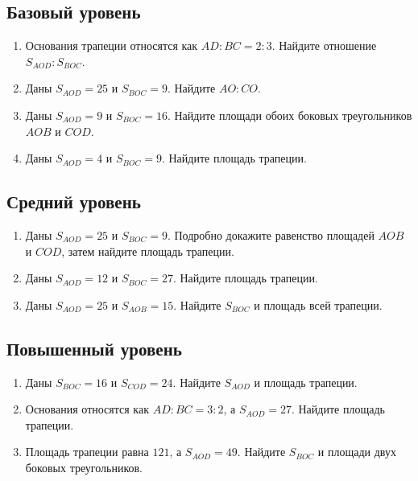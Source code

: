 \documentclass[a4paper,12pt]{article}
\begin{document}
\subsection{Базовый уровень}
\begin{enumerate}[label=\textbf{\arabic*.},itemsep=9pt]
\item Основания трапеции относятся как $AD:BC=2:3$. Найдите отношение $S_{AOD}:S_{BOC}$.
\item Даны $S_{AOD}=25$ и $S_{BOC}=9$. Найдите $AO:CO$.
\item Даны $S_{AOD}=9$ и $S_{BOC}=16$. Найдите площади обоих боковых треугольников $AOB$ и $COD$.
\item Даны $S_{AOD}=4$ и $S_{BOC}=9$. Найдите площадь трапеции.
\end{enumerate}

\subsection{Средний уровень}
\begin{enumerate}[label=\textbf{\arabic*.},start=5,itemsep=9pt]
\item Даны $S_{AOD}=25$ и $S_{BOC}=9$. Подробно докажите равенство площадей $AOB$ и $COD$, затем найдите площадь трапеции.
\item Даны $S_{AOD}=12$ и $S_{BOC}=27$. Найдите площадь трапеции.
\item Даны $S_{AOD}=25$ и $S_{AOB}=15$. Найдите $S_{BOC}$ и площадь всей трапеции.
\end{enumerate}

\subsection{Повышенный уровень}
\begin{enumerate}[label=\textbf{\arabic*.},start=8,itemsep=9pt]
\item Даны $S_{BOC}=16$ и $S_{COD}=24$. Найдите $S_{AOD}$ и площадь трапеции.
\item Основания относятся как $AD:BC=3:2$, а $S_{AOD}=27$. Найдите площадь трапеции.
\item Площадь трапеции равна $121$, а $S_{AOD}=49$. Найдите $S_{BOC}$ и площади двух боковых треугольников.
\end{enumerate}
\clearpage
\end{document}
